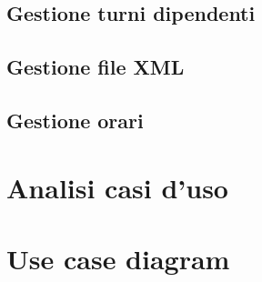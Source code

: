 \subsection{Gestione turni dipendenti}

\subsection{Gestione file XML}

\subsection{Gestione orari}

\section{Analisi casi d'uso}





















\section{Use case diagram}
